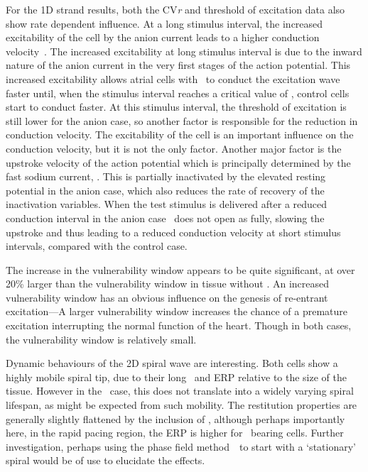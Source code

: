 For the 1D strand results, both the CV\emph{r} and threshold of
excitation data also show rate dependent influence.
At a long stimulus interval, the increased excitability of the cell by the anion
current leads to a higher conduction velocity~\cite{Nygren2000}.
The increased excitability at long stimulus interval is due to the inward nature
of the anion current in the very first stages of the action potential.
This increased excitability allows atrial cells with \ to conduct the
excitation wave faster until, when the stimulus interval reaches a critical value of
, control cells start to conduct faster.
At this stimulus interval, the threshold of excitation is still lower for the
anion case, so another factor is responsible for the reduction in conduction
velocity.
The excitability of the cell is an important influence on the conduction
velocity, but it is not the only factor.
Another major factor is the upstroke velocity of the action potential which is principally
determined by the fast sodium current, .
This is partially inactivated by the elevated resting potential in the anion
case, which also reduces the rate of recovery of the inactivation variables.
When the test stimulus is delivered after a reduced conduction interval in the
anion case \ does not open as fully, slowing the upstroke and thus
leading to a reduced conduction velocity at short stimulus intervals, compared
with the control case.

The increase in the
vulnerability window appears to be quite significant, at over 20\% larger than
the vulnerability window in tissue without .
An increased vulnerability window has an obvious influence on the genesis of
re-entrant excitation---A larger vulnerability window increases the chance of a
premature excitation interrupting the normal function of the heart.
Though in both cases, the vulnerability window is relatively small.


Dynamic behaviours of the 2D spiral wave are interesting.
Both cells show a highly mobile spiral tip, due to their long \apd\ and ERP
relative to the size of the tissue.
However in the \ case, this does not translate into a widely varying
spiral lifespan, as might be expected from such mobility.
The restitution properties are generally slightly flattened by the inclusion of
, although perhaps importantly here, in the rapid pacing region, the
ERP is higher for \ bearing cells.
Further investigation, perhaps using the phase field
method~\cite{Biktashev1994}\ to start with a `stationary' spiral would be of use
to elucidate the effects.



